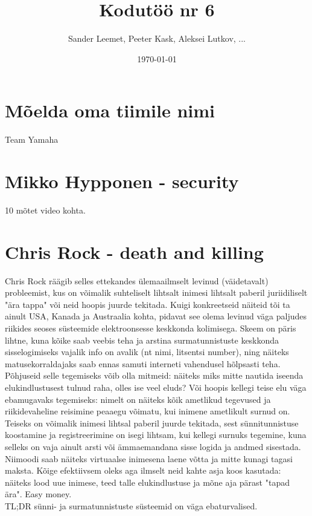 \documentclass{article}
\title{Kodutöö nr 6}
\author{Sander Leemet, Peeter Kask, Aleksei Lutkov, ...}
\date{\today}
\begin{document}
\maketitle

\section{Mõelda oma tiimile nimi}
Team Yamaha

\section{Mikko Hypponen - security}
10 mõtet video kohta.

\section{Chris Rock - death and killing}
Chris Rock räägib selles ettekandes ülemaailmselt levinud (väidetavalt) probleemist, 
kus on võimalik suhteliselt lihtsalt inimesi lihtsalt paberil juriidiliselt "ära tappa" või neid hoopis juurde tekitada. 
Kuigi konkreetseid näiteid tõi ta ainult USA, Kanada ja Austraalia kohta, pidavat see olema levinud väga paljudes riikides 
seoses süsteemide elektroonsesse keskkonda kolimisega. Skeem on päris lihtne, kuna kõike saab veebis teha ja 
arstina surmatunnistuste keskkonda sisselogimiseks vajalik info on avalik (nt nimi, litsentsi number), ning näiteks 
matusekorraldajaks saab ennas samuti interneti vahendusel hõlpsasti teha. Põhjuseid selle tegemiseks võib olla mitmeid: 
näiteks miks mitte nautida iseenda elukindlustusest tulnud raha, olles ise veel eluds? Või hoopis kellegi teise elu väga ebamugavaks 
tegemiseks: nimelt on näiteks kõik ametlikud tegevused ja riikidevaheline reisimine peaaegu võimatu, kui inimene ametlikult surnud on. 
Teiseks on võimalik inimesi lihtsal paberil juurde tekitada, sest sünnitunnistuse koostamine ja registreerimine on isegi lihtsam, 
kui kellegi surnuks tegemine, kuna selleks on vaja ainult arsti või ämmaemandana sisse logida ja andmed sisestada. 
Niimoodi saab näiteks virtuaalse inimesena laene võtta ja mitte kunagi tagasi maksta. Kõige efektiivsem oleks aga ilmselt neid kahte asja koos kasutada: 
näiteks lood uue inimese, teed talle elukindlustuse ja mõne aja pärast "tapad ära". Easy money.\\
TL;DR sünni- ja surmatunnistuste süsteemid on väga ebaturvalised.
\end{document}

